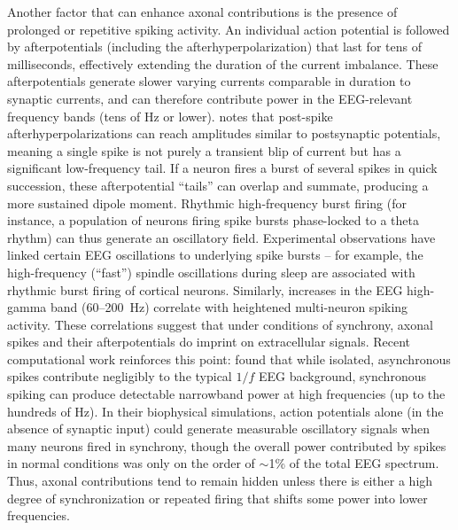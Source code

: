 \documentclass[final, a4paper,masters,en,listoffigures,listoftables,norwegiandates]{NMBU}
\begin{document}
Another factor that can enhance axonal contributions is the presence of prolonged or repetitive spiking activity. An individual action potential is followed by afterpotentials (including the afterhyperpolarization) that last for tens of milliseconds, effectively extending the duration of the current imbalance. These afterpotentials generate slower varying currents comparable in duration to synaptic currents, and can therefore contribute power in the EEG-relevant frequency bands (tens of Hz or lower). \textcite{Bean2007} notes that post-spike afterhyperpolarizations can reach amplitudes similar to postsynaptic potentials, meaning a single spike is not purely a transient blip of current but has a significant low-frequency tail. If a neuron fires a burst of several spikes in quick succession, these afterpotential “tails” can overlap and summate, producing a more sustained dipole moment. Rhythmic high-frequency burst firing (for instance, a population of neurons firing spike bursts phase-locked to a theta rhythm) can thus generate an oscillatory field. Experimental observations have linked certain EEG oscillations to underlying spike bursts – for example, the high-frequency (“fast”) spindle oscillations during sleep are associated with rhythmic burst firing of cortical neurons. Similarly, increases in the EEG high-gamma band (60–200~Hz) correlate with heightened multi-neuron spiking activity. These correlations suggest that under conditions of synchrony, axonal spikes and their afterpotentials do imprint on extracellular signals. Recent computational work reinforces this point: \textcite{Brake2025} found that while isolated, asynchronous spikes contribute negligibly to the typical $1/f$ EEG background, synchronous spiking can produce detectable narrowband power at high frequencies (up to the hundreds of Hz). In their biophysical simulations, action potentials alone (in the absence of synaptic input) could generate measurable oscillatory signals when many neurons fired in synchrony, though the overall power contributed by spikes in normal conditions was only on the order of $\sim$1\% of the total EEG spectrum. Thus, axonal contributions tend to remain hidden unless there is either a high degree of synchronization or repeated firing that shifts some power into lower frequencies.
\end{document}
